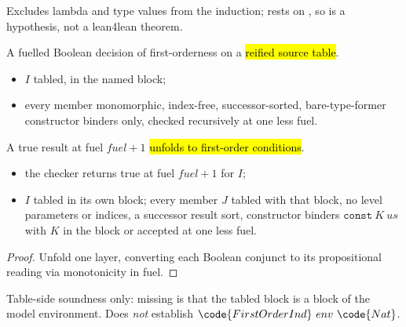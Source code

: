 \begin{remark}
 Excludes lambda and type values from the induction; rests on , so is a
hypothesis, not a lean4lean theorem.
\end{remark}

\begin{definition}
\label{def:firstOrderIndB}
\leanok
{}
 A fuelled Boolean decision of first-orderness on a \hl{reified source table}.
\begin{itemize}
\item $I$ tabled, in the named block;
\item every member monomorphic, index-free, successor-sorted, bare-type-former constructor binders only,
checked recursively at one less fuel.
\end{itemize}
\end{definition}

\begin{lemma}
\label{lem:firstOrderIndB_step}
\leanok
{}
 A true result at fuel $\mathit{fuel}+1$ \hl{unfolds to first-order conditions}.
\begin{itemize}
\item {} the checker returns true at fuel $\mathit{fuel}+1$ for $I$;
\item {} $I$ tabled in its own block; every member $J$ tabled with that block, no level
parameters or indices, a successor result sort, constructor binders $\mathtt{const}\ K\ us$ with $K$ in
the block or accepted at one less fuel.
\end{itemize}
\end{lemma}
\begin{proof}
\leanok
{}
 Unfold one layer, converting each Boolean conjunct to its propositional reading via
monotonicity in fuel.
\end{proof}

\begin{remark}
 Table-side soundness only: missing is that the tabled block is a block of the model
environment. Does \emph{not} establish $\code{FirstOrderInd}\ env\ \code{Nat}$.
\end{remark}

